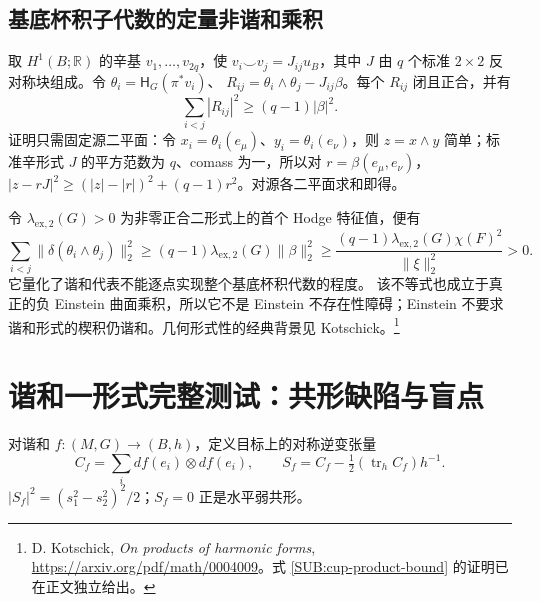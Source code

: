 \documentclass[UTF8,fontset=fandol,zihao=-4,oneside,openany]{ctexbook}
\theoremstyle{cjkplain}
\numberwithin{equation}{chapter}
\begin{document}
\subsection{基底杯积子代数的定量非谐和乘积}

取 $H^1(B;\mathbb R)$ 的辛基 $v_1,\ldots,v_{2q}$，使
$v_i\smile v_j=J_{ij}u_B$，其中 $J$ 由 $q$ 个标准 $2\times2$ 反对称块组成。令
$\theta_i=\mathsf H_G(\pi^*v_i)$、
$R_{ij}=\theta_i\wedge\theta_j-J_{ij}\beta$。每个 $R_{ij}$ 闭且正合，并有
\begin{equation}\label{SUB:cup-product-bound}
\sum_{i<j}|R_{ij}|^2\ge(q-1)|\beta|^2.
\end{equation}
证明只需固定源二平面：令 $x_i=\theta_i(e_\mu)$、$y_i=\theta_i(e_\nu)$，则 $z=x\wedge y$ 简单；标准辛形式 $J$ 的平方范数为 $q$、comass 为一，所以对 $r=\beta(e_\mu,e_\nu)$，
$|z-rJ|^2\ge(|z|-|r|)^2+(q-1)r^2$。对源各二平面求和即得。

令 $\lambda_{\mathrm{ex},2}(G)>0$ 为非零正合二形式上的首个 Hodge 特征值，便有
\begin{equation}\label{SUB:cup-codifferential}
\sum_{i<j}\|\delta(\theta_i\wedge\theta_j)\|_2^2
\ge(q-1)\lambda_{\mathrm{ex},2}(G)\|\beta\|_2^2
\ge\frac{(q-1)\lambda_{\mathrm{ex},2}(G)\chi(F)^2}{\|\xi\|_2^2}>0.
\end{equation}
它量化了谐和代表不能逐点实现整个基底杯积代数的程度。
该不等式也成立于真正的负 Einstein 曲面乘积，所以它不是 Einstein 不存在性障碍；Einstein 不要求谐和形式的楔积仍谐和。几何形式性的经典背景见 Kotschick。\footnote{D. Kotschick, \emph{On products of harmonic forms}, \url{https://arxiv.org/pdf/math/0004009}。式 \eqref{SUB:cup-product-bound} 的证明已在正文独立给出。}

\section{谐和一形式完整测试：共形缺陷与盲点}

对谐和 $f:(M,G)\to(B,h)$，定义目标上的对称逆变张量
\[
C_f=\sum_i df(e_i)\otimes df(e_i),\qquad
S_f=C_f-\tfrac12(\operatorname{tr}_hC_f)h^{-1}.
\]
$|S_f|^2=(s_1^2-s_2^2)^2/2$；$S_f=0$ 正是水平弱共形。
\end{document}
